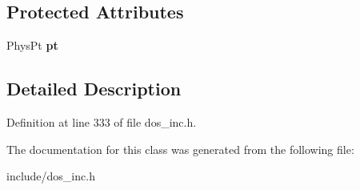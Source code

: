 \subsection*{Protected Attributes}
\begin{DoxyCompactItemize}
\item 
\hypertarget{classMemStruct_acac6123c566805e45fb8ff9e7744d3e2}{Phys\-Pt {\bfseries pt}}\label{classMemStruct_acac6123c566805e45fb8ff9e7744d3e2}

\end{DoxyCompactItemize}


\subsection{Detailed Description}


Definition at line 333 of file dos\-\_\-inc.\-h.



The documentation for this class was generated from the following file\-:\begin{DoxyCompactItemize}
\item 
include/dos\-\_\-inc.\-h\end{DoxyCompactItemize}
